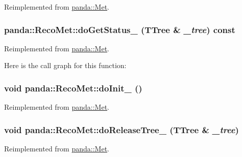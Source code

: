 Reimplemented from \hyperlink{classpanda_1_1Met_a83b50dafc33d3e97271e54ad1709e16e}{panda::Met}.\hypertarget{classpanda_1_1RecoMet_a17e58c29268fd0e3f84467046cf28f2b}{
\subsubsection[{doGetStatus\_\-}]{ panda::RecoMet::doGetStatus\_\- (TTree \& {\em \_\-tree}) const}}
\label{classpanda_1_1RecoMet_a17e58c29268fd0e3f84467046cf28f2b}


Reimplemented from \hyperlink{classpanda_1_1Met_aa3b7a9f0bbbc48a0dbf21909c0c18d30}{panda::Met}.

Here is the call graph for this function:\hypertarget{classpanda_1_1RecoMet_aa94e2fce017ff71bd6fcfa4f02356248}{
\subsubsection[{doInit\_\-}]{\setlength{\rightskip}{0pt plus 5cm}void panda::RecoMet::doInit\_\- ()}}
\label{classpanda_1_1RecoMet_aa94e2fce017ff71bd6fcfa4f02356248}


Reimplemented from \hyperlink{classpanda_1_1Met_a72f7fac415a4777315b1e170aa1afca4}{panda::Met}.\hypertarget{classpanda_1_1RecoMet_a264ac3eeeaf567babde8c3847317bcc9}{
\subsubsection[{doReleaseTree\_\-}]{\setlength{\rightskip}{0pt plus 5cm}void panda::RecoMet::doReleaseTree\_\- (TTree \& {\em \_\-tree})}}
\label{classpanda_1_1RecoMet_a264ac3eeeaf567babde8c3847317bcc9}


Reimplemented from \hyperlink{classpanda_1_1Met_a6df0a7e59b6d57c0e2b86702383f509d}{panda::Met}.

